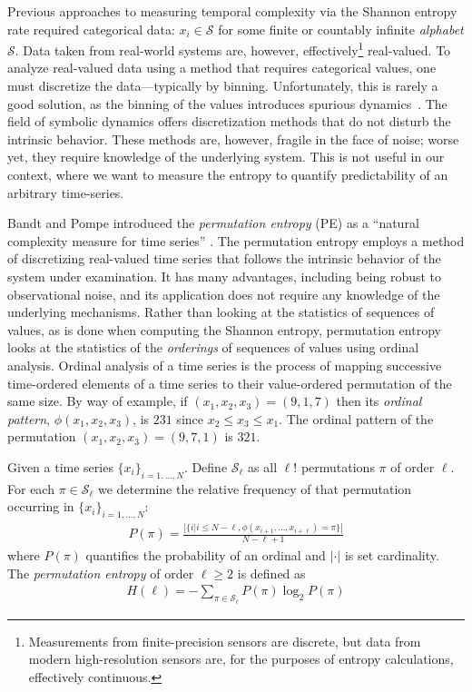Previous approaches to measuring temporal complexity via the Shannon
entropy rate \cite{Shannon1951, mantegna1994linguistic} required
categorical data: $x_i \in \mathcal{S}$ for some finite or countably
infinite \emph{alphabet} $\mathcal{S}$.  Data taken from real-world
systems are, however, effectively\footnote{Measurements from
  finite-precision sensors are discrete, but data from modern
  high-resolution sensors are, for the purposes of entropy
  calculations, effectively continuous.}  real-valued.  To analyze
real-valued data using a method that requires categorical values, one
must discretize the data---typically by binning.  Unfortunately, this
is rarely a good solution, as the binning of the values introduces
spurious dynamics~\cite{bollt2001}.  The field of symbolic dynamics
offers discretization methods that do not disturb the intrinsic
behavior.  These methods are, however, fragile in the face of noise;
worse yet, they require knowledge of the underlying system.  This is
not useful in our context, where we want to measure the entropy to
quantify predictability of an arbitrary time-series.

Bandt and Pompe introduced the \emph{permutation entropy} (PE) as a
``natural complexity measure for time series''
\cite{bandt2002per}. The permutation entropy employs a method of
discretizing real-valued time series that follows the intrinsic
behavior of the system under examination.  It has many advantages,
including being robust to observational noise, and its application
does not require any knowledge of the underlying mechanisms.  Rather
than looking at the statistics of sequences of values, as is done when
computing the Shannon entropy, permutation entropy looks at the
statistics of the \emph{orderings} of sequences of values using
ordinal analysis. Ordinal analysis of a time series is the process of
mapping successive time-ordered elements of a time series to their
value-ordered permutation of the same size.  By way of example, if
$(x_1, x_2, x_3) = (9, 1, 7)$ then its \emph{ordinal pattern},
$\phi(x_1, x_2, x_3)$, is $231$ since $x_2 \leq x_3 \leq x_1$.  The
ordinal pattern of the permutation $(x_1, x_2, x_3) = (9, 7, 1)$ is
$321$.

\begin{mydef}

  Given a time series $\{x_i\}_{i = 1,\dots,N}$. Define $\mathcal{S}_\ell$ as all $\ell!$ permutations $\pi$ of order $\ell$. For each $\pi \in \mathcal{S}_\ell$ we determine the relative frequency of that permutation occurring in $\{x_i\}_{i = 1,\dots,N}$:
  \begin{align*}
    P(\pi) = \frac{\left|\{i|i \leq N-\ell,\phi(x_{i+1},\dots,x_{i+\ell}) = \pi\}\right|}{N-\ell+1}
  \end{align*}
  where $P(\pi)$ quantifies the probability of an ordinal and
  $|\cdot|$ is set cardinality. The \emph{permutation entropy} of
  order $\ell \ge 2$ is defined as
  \begin{align*}
    H(\ell) = - \sum_{\pi \in \mathcal{S}_\ell} P(\pi) \log_2 P(\pi)
  \end{align*}

\end{mydef}

